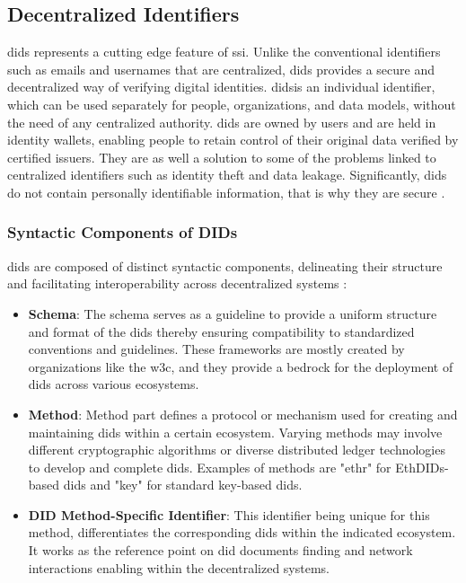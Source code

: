 \subsection{Decentralized Identifiers}

\gls{did}s represents a cutting edge feature of \gls{ssi}. Unlike the conventional identifiers such as emails and usernames that are 
centralized, \gls{did}s provides a secure and decentralized way of verifying digital identities. \gls{did}sis an individual identifier, which can be used separately for people, 
organizations, and data models, without the need of any centralized authority. \gls{did}s are owned by users and are held in identity wallets, enabling people to retain control 
of their original data verified by certified issuers. \cite{ciscofpie} They are as well a solution to some of the problems linked to centralized identifiers such as identity theft and data 
leakage. Significantly, \gls{did}s do not contain personally identifiable information, that is why they are secure \cite{9333997}. 

\subsubsection{Syntactic Components of DIDs}

\gls{did}s are composed of distinct syntactic components, delineating their structure and facilitating interoperability across decentralized systems \cite{w3didcore} :

\begin{itemize}
  \item \textbf{Schema}: The schema serves as a guideline to provide a uniform structure and format of the \gls{did}s thereby ensuring compatibility to standardized conventions 
  and guidelines. These frameworks are mostly created by organizations like the \gls{w3c}, and they provide a bedrock for the deployment of \gls{did}s across
  various ecosystems.
  \item \textbf{Method}: Method part defines a protocol or mechanism used for creating and maintaining \gls{did}s within a certain ecosystem. Varying methods may involve different
   cryptographic algorithms or diverse distributed ledger technologies to develop and complete \gls{did}s. Examples of methods are "ethr" for EthDIDs-based \gls{did}s and "key" for 
   standard key-based \gls{did}s.
  \item \textbf{DID Method-Specific Identifier}: This identifier being unique for this method, differentiates the corresponding \gls{did}s within the indicated ecosystem. It 
  works as the reference point on \gls{did} documents finding and network interactions enabling within the decentralized systems.
\end{itemize}

